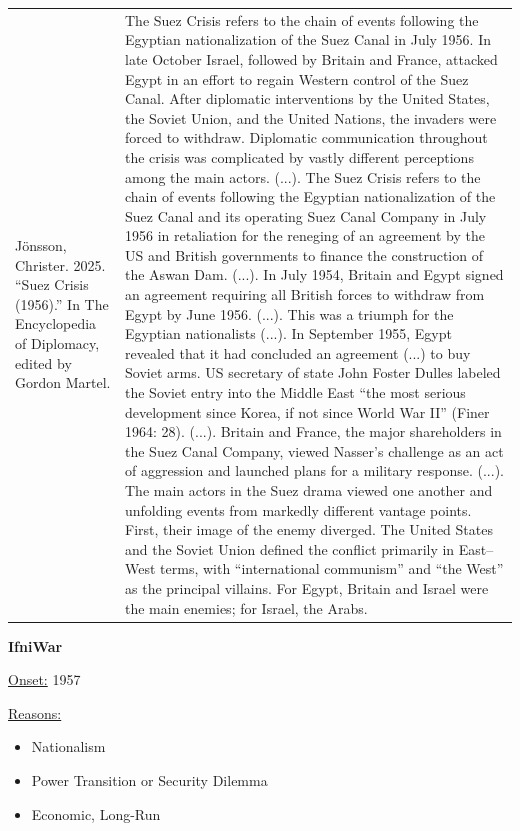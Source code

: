 {\begin{longtable}{p{}p{}}
Jönsson, Christer. 2025. “Suez Crisis (1956).” In The Encyclopedia of Diplomacy, edited by Gordon Martel. & The Suez Crisis refers to the chain of events following the Egyptian nationalization of the Suez Canal in July 1956. In late October Israel, followed by Britain and France, attacked Egypt in an effort to regain Western control of the Suez Canal. After diplomatic interventions by the United States, the Soviet Union, and the United Nations, the invaders were forced to withdraw. Diplomatic communication throughout the crisis was complicated by vastly different perceptions among the main actors. (...). The Suez Crisis refers to the chain of events following the Egyptian nationalization of the Suez Canal and its operating Suez Canal Company in July 1956 in retaliation for the reneging of an agreement by the US and British governments to finance the construction of the Aswan Dam. (...).
In July 1954, Britain and Egypt signed an agreement requiring all British forces to withdraw from Egypt by June 1956. (...). This was a triumph for the Egyptian nationalists (...). In September 1955, Egypt revealed that it had concluded an agreement (...) to buy Soviet arms. US secretary of state John Foster Dulles labeled the Soviet entry into the Middle East “the most serious development since Korea, if not since World War II” (Finer 1964: 28). (...). Britain and France, the major shareholders in the Suez Canal Company, viewed Nasser's challenge as an act of aggression and launched plans for a military response. (...).
The main actors in the Suez drama viewed one another and unfolding events from markedly different vantage points. First, their image of the enemy diverged. The United States and the Soviet Union defined the conflict primarily in East–West terms, with “international communism” and “the West” as the principal villains. For Egypt, Britain and Israel were the main enemies; for Israel, the Arabs.
\\
\end{longtable}}
\clearpage
         \textbf{IfniWar} 

          \underline{Onset:} 1957         

\underline{Reasons:}
\begin{itemize}
\item Nationalism
\item Power Transition or Security Dilemma
\item Economic, Long-Run
\end{itemize}

